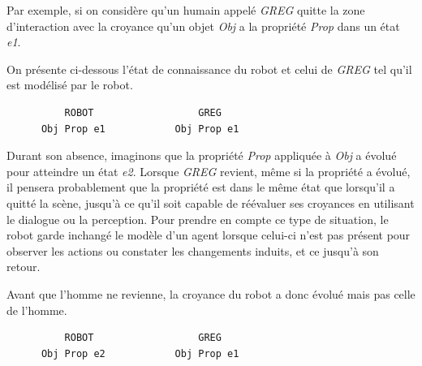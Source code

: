 \documentclass[a4paper,11pt,twoside]{StyleThese}
\begin{document}

Par exemple, si on considère qu'un humain appelé \textit{GREG} quitte la zone d'interaction avec la croyance qu'un objet \textit{Obj} a la propriété \textit{Prop} dans un état \textit{e1}. 

On présente ci-dessous l'état de connaissance du robot et celui de \textit{GREG} tel qu'il est modélisé par le robot.

\begin{scriptsize}
\begin{verbatim}
          ROBOT                  GREG
      Obj Prop e1            Obj Prop e1
\end{verbatim}
\end{scriptsize}

Durant son absence, imaginons que la propriété \textit{Prop} appliquée à \textit{Obj} a évolué pour atteindre un état \textit{e2}.
Lorsque \textit{GREG} revient, même si la propriété a évolué, il pensera probablement que la propriété est dans le même état que lorsqu'il a quitté la scène, jusqu'à ce qu'il soit capable de réévaluer ses croyances en utilisant le dialogue ou la perception. Pour prendre en compte ce type de situation, le robot garde inchangé le modèle d'un agent lorsque celui-ci n'est pas présent pour observer les actions ou constater les changements induits, et ce jusqu'à son retour.

Avant que l'homme ne revienne, la croyance du robot a donc évolué mais pas celle de l'homme.

\begin{scriptsize}
\begin{verbatim}
          ROBOT                  GREG
      Obj Prop e2            Obj Prop e1
\end{verbatim}
\end{scriptsize}
\end{document}
